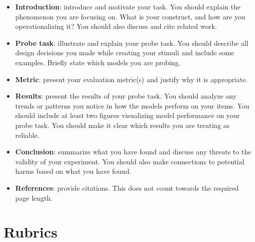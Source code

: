 \documentclass[12pt,table]{article}
\begin{document}
\begin{itemize}
\item \textbf{Introduction}: introduce and motivate your task. You should explain the phenomenon you are focusing on. What is your construct, and how are you operationalizing it? You should also discuss and cite related work.
\item \textbf{Probe task}: illustrate and explain your probe task. You should describe all design decisions you made while creating your stimuli and include some examples. Briefly state which models you are probing.
\item \textbf{Metric}: present your evaluation metric(s) and justify why it is appropriate.
\item \textbf{Results}: present the results of your probe task. You should analyze any trends or patterns you notice in how the models perform on your items. You should include at least two figures visualizing model performance on your probe task. You should make it clear which results you are treating as reliable.
\item \textbf{Conclusion}: summarize what you have found and discuss any threats to the validity of your experiment. You should also make connections to potential harms based on what you have found.
\item \textbf{References}: provide citations. This does not count towards the required page length.
\end{itemize}

\section{Rubrics}
\end{document}

